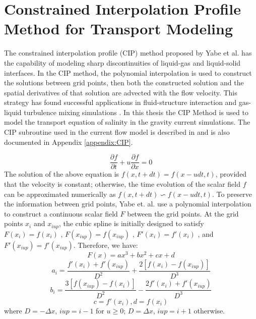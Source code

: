 \normalsize
\section{Constrained Interpolation Profile Method for Transport Modeling}

The constrained interpolation profile (CIP) method proposed by Yabe et al. \cite{Yabe1991A, Yabe1991B, Yabe01, Xiao1999} has the capability of modeling sharp discontinuities of liquid-gas and liquid-solid interfaces. In the CIP method, the polynomial interpolation is used to construct the solutions between grid points, then both the constructed solution and the spatial derivatives of that solution are advected with the flow velocity. This strategy has found successful applications in fluid-structure interaction and gas-liquid turbulence mixing simulations \cite{Yabe01}. In this thesis the CIP Method is used to model the transport equation of salinity in the gravity current simulations. The CIP subroutine used in the current flow model is described in \cite{Xiao1999} and is also documented in Appendix \ref{appendix:CIP}.

\begin{equation}
\frac {\partial f}{\partial t} + u \frac {\partial f}{\partial
x}=0
\end{equation}
The solution of the above equation is $f(x,t+dt)=f(x-udt,t)$, provided
that the velocity is constant; otherwise, the time evolution of
the scalar field $f$ can be approximated numerically as $f(x,t+dt)
\backsim f(x-udt,t)$.
To preserve the information between grid points, Yabe et. al. \cite{Yabe1991A, Yabe1991B, Yabe01, Xiao1999} use a polynomial interpolation to construct a continuous scalar field $F$ between the grid points. At the grid points $ x_i $ and $x_{iup}$, the cubic spline is initially designed to satisfy $F(x_i)=f(x_i)$ , $F(x_{i up})=f(x_{iup})$ ,
$F'(x_i)=f'(x_i)$ , and $F'(x_{iup})=f'(x_{iup})$. Therefore, we
have:
\begin{equation}
F(x)=ax^3+bx^2+cx+d
\end{equation}
\begin{equation}
a_i=\frac{f'(x_i)+f'(x_{iup})}{D^2}+\frac{2[f(x_i)-f(x_{iup})]}{D^3}
\end{equation}
\begin{equation}
b_i=\frac{3[f(x_{iup})-f(x_i)]}{D^2}-\frac{2f'(x_i)+f'(x_{iup})}{D^3}
\end{equation}
\begin{equation}
c=f'(x_i),  d=f(x_i)
\end{equation}
where $D=-\Delta x$, $iup=i-1$ for $u\geq 0$; $D=\Delta x$,
$iup=i+1$ otherwise.

